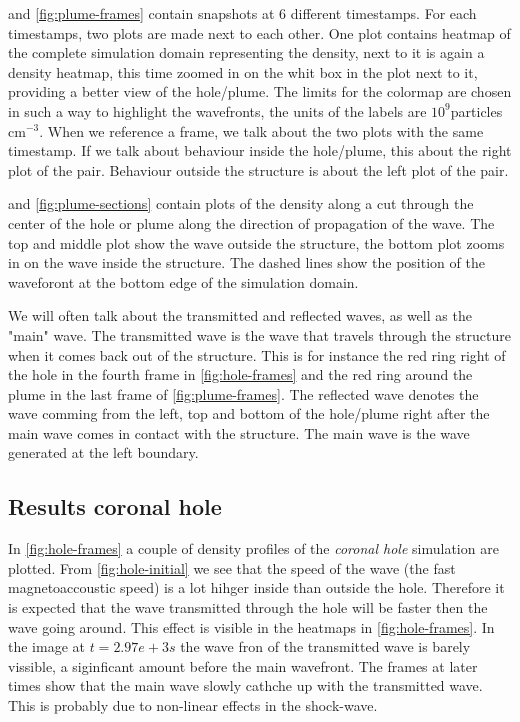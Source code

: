  and \cref{fig:plume-frames} contain snapshots at 6 different timestamps.
For each timestamps, two plots are made next to each other.
One plot contains heatmap of the complete simulation domain representing the density, next to it is again a density heatmap, this time zoomed in on the whit box in the plot next to it, providing a better view of the hole/plume.
The limits for the colormap are chosen in such a way to highlight the wavefronts, the units of the labels are $10^9$particles cm$^{-3}$.
When we reference a frame, we talk about the two plots with the same timestamp. If we talk about behaviour inside the hole/plume, this about the right plot of the pair.
Behaviour outside the structure is about the left plot of the pair.

 and \cref{fig:plume-sections} contain plots of the density along a cut through the center of the hole or plume along the direction of propagation of the wave.
The top and middle plot show the wave outside the structure, the bottom plot zooms in on the wave inside the structure.
The dashed lines show the position of the waveforont at the bottom edge of the simulation domain.

We will often talk about the transmitted and reflected waves, as well as the "main" wave. 
The transmitted wave is the wave that travels through the structure when it comes back out of the structure.
This is for instance the red ring right of the hole in the fourth frame in \cref{fig:hole-frames} and the red ring around the plume in the last frame of \cref{fig:plume-frames}.
The reflected wave denotes the wave comming from the left, top and bottom of the hole/plume right after the main wave comes in contact with the structure.
The main wave is the wave generated at the left boundary.


\subsection{Results coronal hole}
In \cref{fig:hole-frames} a couple of density profiles of the \emph{coronal hole} simulation are plotted.
From \cref{fig:hole-initial} we see that the speed of the wave (the fast magnetoaccoustic speed) is a lot hihger inside than outside the hole.
Therefore it is expected that the wave transmitted through the hole will be faster then the wave going around.
This effect is visible in the heatmaps in \cref{fig:hole-frames}. 
In the image at $t=2.97e+3s$ the wave fron of the transmitted wave is barely vissible, a siginficant amount before the main wavefront.
The frames at later times show that the main wave slowly cathche up with the transmitted wave. This is probably due to non-linear effects in the shock-wave.

